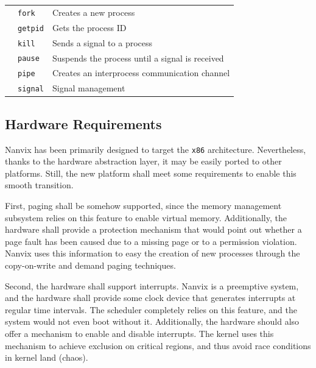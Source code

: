 \documentclass[10pt,a4paper]{article}
\begin{document}
\begin{table}[t]
\begin{tabular}{l l l}
	                                     & \texttt{fork}     & Creates a new process                           \\
	                                     & \texttt{getpid}   & Gets the process ID                             \\
	                                     & \texttt{kill}     & Sends a signal to a process                     \\
	                                     & \texttt{pause}    & Suspends the process until a signal is received \\
	                                     & \texttt{pipe}     & Creates an interprocess communication channel   \\
	                                     & \texttt{signal}   & Signal management                               \\
	\bottomrule
\end{tabular}
\end{table}

\subsection{Hardware Requirements}
\label{section: hardware requirements}

Nanvix has been primarily designed to target the \texttt{x86} architecture. Nevertheless, thanks to the hardware abstraction layer, it may be easily ported to other platforms. Still, the new platform shall meet some requirements to enable this smooth transition.

First, paging shall be somehow supported, since the memory management subsystem relies on this feature to enable virtual memory. Additionally, the hardware shall provide a protection mechanism that would point out whether a page fault has been caused due to a missing page or to a permission violation. Nanvix uses this information to easy the creation of new processes through the copy-on-write and demand paging techniques.

Second, the hardware shall support interrupts. Nanvix is a preemptive system, and the hardware shall provide some clock device that generates interrupts at regular time intervals. The scheduler completely relies on this feature, and the system would not even boot without it. Additionally, the hardware should also offer a mechanism to enable and disable interrupts. The kernel uses this mechanism to achieve exclusion on critical regions, and thus avoid race conditions in kernel land (chaos).
\end{document}
